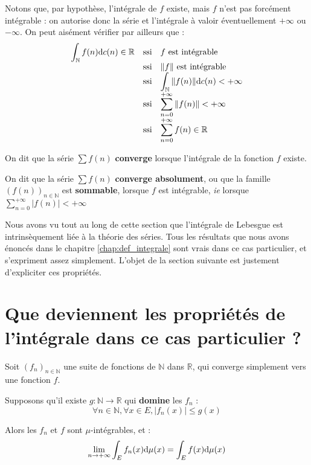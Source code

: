 \documentclass[../integ-proba.tex]{subfiles}
\begin{document}
\begin{rem}
    Notons que, par hypothèse, l'intégrale de $f$ existe, mais $f$ n'est pas forcément intégrable : on autorise donc la série et l'intégrale à valoir éventuellement $+\infty$ ou $-\infty$.
    On peut aisément vérifier par ailleurs que :
    $$
    {
    \everymath={\displaystyle}
    \begin{array}{rcl}
        \int_\mathbb{N} f(n) \text{d} c(n) \in \mathbb{R} & \text{ssi} & f \text{ est intégrable } \\
                                                          & \text{ssi} & \|f\| \text{ est intégrable} \\
                                                          & \text{ssi} & \int_\mathbb{N} \|f(n)\| \text{d} c(n) < + \infty \\
                                                          & \text{ssi} & \sum_{n=0}^{+ \infty} \|f(n)\| < + \infty \\
                                                          & \text{ssi} & \sum_{n=0}^{+ \infty} f(n) \in \mathbb{R}
    \end{array}
    }
    $$
\end{rem}

\begin{defi}
    On dit que la série $\sum f(n)$ \textbf{converge} lorsque l'intégrale de la fonction $f$ existe.

    On dit que la série $\sum f(n)$ \textbf{converge absolument}, ou que la famille $\left(f(n)\right)_{n \in \mathbb{N}}$ est \textbf{sommable}, lorsque $f$ est intégrable, \textit{ie} lorsque $\sum_{n=0}^{+ \infty} \left|f(n)\right| < + \infty$
\end{defi}

Nous avons vu tout au long de cette section que l'intégrale de Lebesgue est intrinsèquement liée à la théorie des séries.
Tous les résultats que nous avons énoncés dans le chapitre \ref{chap:def_integrale} sont vrais dans ce cas particulier, et s'expriment assez simplement.
L'objet de la section suivante est justement d'expliciter ces propriétés.

\section{Que deviennent les propriétés de l'intégrale dans ce cas particulier ?}

\begin{thm}
  Soit $\left(f_n\right)_{n \in \mathbb{N}}$ une suite de fonctions de $\mathbb{N}$ dans $\mathbb{R}$, qui converge simplement vers une fonction $f$.

  Supposons qu'il existe $g:\mathbb{N} \longrightarrow \mathbb{R}$ qui \textbf{domine} les $f_n$ :
  $$
  \forall n \in \mathbb{N}, \forall x \in E, \left|f_n(x)\right| \leq g(x)
  $$

  Alors les $f_n$ et $f$ sont $\mu$-intégrables, et :
  $$
  \lim_{n \to + \infty} \int_E f_n(x) \textnormal{d}\mu(x) = \int_E f(x) \textnormal{d}\mu(x)
  $$
\end{thm}
\end{document}
